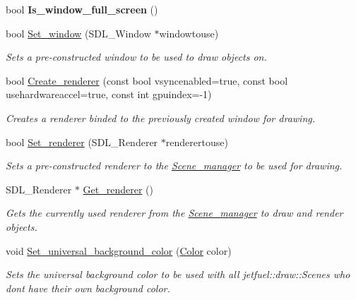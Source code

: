 \begin{DoxyCompactItemize}
\mbox{\label{classjetfuel_1_1draw_1_1Scene__manager_a57b2faedff201343364002b29cb8e3cb}} 
bool {\bfseries Is\+\_\+window\+\_\+full\+\_\+screen} ()
\item 
bool \hyperlink{classjetfuel_1_1draw_1_1Scene__manager_a3a13d30af1a38eddd47c4959062b3d9b}{Set\+\_\+window} (S\+D\+L\+\_\+\+Window $\ast$windowtouse)
\begin{DoxyCompactList}\small\item\em Sets a pre-\/constructed window to be used to draw objects on. \end{DoxyCompactList}\item 
bool \hyperlink{classjetfuel_1_1draw_1_1Scene__manager_afafecd926ce5e4b2543a6d583a7d24b6}{Create\+\_\+renderer} (const bool vsyncenabled=true, const bool usehardwareaccel=true, const int gpuindex=-\/1)
\begin{DoxyCompactList}\small\item\em Creates a renderer binded to the previously created window for drawing. \end{DoxyCompactList}\item 
bool \hyperlink{classjetfuel_1_1draw_1_1Scene__manager_ac74ac2f84b41a181fe1c3814ee9a602f}{Set\+\_\+renderer} (S\+D\+L\+\_\+\+Renderer $\ast$renderertouse)
\begin{DoxyCompactList}\small\item\em Sets a pre-\/constructed renderer to the \hyperlink{classjetfuel_1_1draw_1_1Scene__manager}{Scene\+\_\+manager} to be used for drawing. \end{DoxyCompactList}\item 
S\+D\+L\+\_\+\+Renderer $\ast$ \hyperlink{classjetfuel_1_1draw_1_1Scene__manager_af8356086304df2aff630e09f07d57ca7}{Get\+\_\+renderer} ()
\begin{DoxyCompactList}\small\item\em Gets the currently used renderer from the \hyperlink{classjetfuel_1_1draw_1_1Scene__manager}{Scene\+\_\+manager} to draw and render objects. \end{DoxyCompactList}\item 
void \hyperlink{classjetfuel_1_1draw_1_1Scene__manager_afb917b4617be734b81c66c3618eb16dd}{Set\+\_\+universal\+\_\+background\+\_\+color} (\hyperlink{classjetfuel_1_1draw_1_1Color}{Color} color)
\begin{DoxyCompactList}\small\item\em Sets the universal background color to be used with all jetfuel\+::draw\+::\+Scenes who don\textquotesingle{}t have their own background color. \end{DoxyCompactList}\item 

\end{DoxyCompactItemize}
